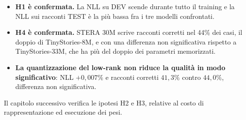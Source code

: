 \begin{itemize}
\item \textbf{H1 è confermata.} La NLL su DEV scende durante tutto il training e la NLL sui racconti TEST è la più bassa fra i tre modelli confrontati.
\item \textbf{H4 è confermata.} STERA 30M scrive racconti corretti nel 44\% dei casi, il doppio di TinyStories-8M, e con una differenza non significativa rispetto a TinyStories-33M, che ha più del doppio dei parametri memorizzati.
\item \textbf{La quantizzazione del low-rank non riduce la qualità in modo significativo}: NLL $+0{,}007\%$ e racconti corretti $41{,}3\%$ contro $44{,}0\%$, differenza non significativa.
\end{itemize}

Il capitolo successivo verifica le ipotesi H2 e H3, relative al costo di rappresentazione ed esecuzione dei pesi.
